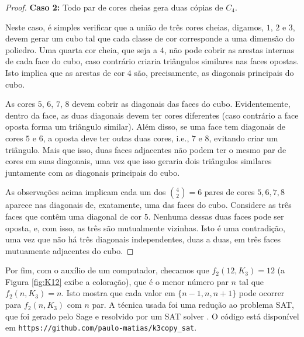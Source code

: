 \documentclass[12pt,a4paper]{book}
\begin{document}
\begin{proof}
\medskip
\textbf{Caso 2:} Todo par de cores cheias gera duas cópias de $C_4$.

Neste caso, é simples verificar que a união de três cores cheias, digamos, $1$, $2$ e $3$, devem gerar um cubo  tal que cada classe de cor corresponde a uma dimensão do poliedro. Uma quarta cor cheia, que seja a $4$, não pode cobrir as arestas internas de cada face do cubo, caso contrário criaria triângulos similares nas faces opostas.
Isto implica que as arestas de cor $4$ são, precisamente, as diagonais principais do cubo.

As cores $5$, $6$, $7$, $8$ devem cobrir as diagonais das faces do cubo. Evidentemente, dentro da face, as duas diagonais devem ter cores diferentes (caso contrário a face oposta forma um triângulo similar).
Além disso, se uma face tem diagonais de cores $5$ e $6$, a oposta  deve ter outas duas cores, i.e., $7$ e $8$, evitando criar um triângulo. 
Mais que isso, duas faces adjacentes não podem ter o mesmo par de cores em suas diagonais, uma vez que isso geraria dois triângulos similares juntamente com as diagonais principais do cubo.

As observações acima implicam cada um dos $\binom{4}{2}=6$ pares de cores $5,6,7,8$ aparece nas diagonais de, exatamente, uma das faces do cubo.
Considere as três faces que contêm uma diagonal de cor $5$.
Nenhuma dessas duas faces pode ser oposta, e, com isso, as três são mutualmente vizinhas. Isto é uma contradição, uma vez que não há três diagonais independentes, duas a duas, em três faces mutuamente adjacentes do cubo.
\end{proof}

Por fim, com o auxílio de um computador, checamos que $f_2(12,K_3) = 12$ (a Figura \ref{fig:K12} exibe a coloração), que é o menor número par $n$ tal que $f_2(n,K_3) = n$. Isto mostra que cada valor em $\{n - 1, n, n + 1\}$ pode ocorrer para $f_2(n,K_3)$ com $n$ par.
A técnica usada foi uma redução ao problema SAT, que foi gerado pelo Sage \cite{sagemath} e resolvido por um SAT solver \cite{lingeling}. 
O código está disponível em   %
\texttt{https://github.com/paulo-matias/k3copy\_sat}.
\end{document}
